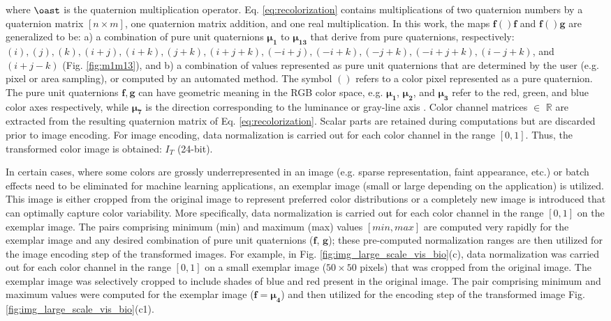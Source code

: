 \documentclass[superscriptaddress,longbibliography,aps,prl,twocolumn,10pt]{revtex4-2}
\begin{document}
\noindent
where $\oast$ is the quaternion multiplication operator. Eq. \ref{eq:recolorization} contains multiplications of two quaternion numbers by a quaternion matrix $[n \times m]$, one quaternion matrix addition, and one real multiplication. In this work, the maps $\boldsymbol{f}()\boldsymbol{f}$ and $\boldsymbol{f}()\boldsymbol{g}$ are generalized to be: a) a combination of pure unit quaternions $\boldsymbol{\mu_{1}}$ to $\boldsymbol{\mu_{13}}$ that derive from pure quaternions, respectively: $(i), (j), (k), (i + j), (i + k), (j + k), (i + j + k), (-i + j), (-i + k), (-j + k), (-i + j + k), (i - j + k)$, and $(i + j - k)$ (Fig. \ref{fig:m1m13}), and b) a combination of values represented as pure unit quaternions that are determined by the user (e.g. pixel or area sampling), or computed by an automated method. The symbol $()$ refers to a color pixel represented as a pure quaternion. The pure unit quaternions $\boldsymbol{f}, \boldsymbol{g}$ can have geometric meaning in the RGB color space, e.g. $\boldsymbol{\mu_1}$, $\boldsymbol{\mu_2}$, and $\boldsymbol{\mu_3}$ refer to the red, green, and blue color axes respectively, while $\boldsymbol{\mu_7}$ is the direction corresponding to the luminance or gray-line axis \cite{Moxey2003, Ell2007a}. Color channel matrices $\in$ $\mathbb{R}$ are extracted from the resulting quaternion matrix of Eq. \ref{eq:recolorization}. Scalar parts are retained during computations but are discarded prior to image encoding. For image encoding, data normalization is carried out for each color channel in the range $[0,1]$. Thus, the transformed color image is obtained: $I_{T}$ (24-bit).

In certain cases, where some colors are grossly underrepresented in an image (e.g. sparse representation, faint appearance, etc.) or batch effects need to be eliminated for machine learning applications, an exemplar image (small or large depending on the application) is utilized. This image is either cropped from the original image to represent preferred color distributions or a completely new image is introduced that can optimally capture color variability. More specifically, data normalization is carried out for each color channel in the range $[0,1]$ on the exemplar image. The pairs comprising minimum (min) and maximum (max) values $[min,max]$ are computed very rapidly for the exemplar image and any desired combination of pure unit quaternions ($\boldsymbol{f}$, $\boldsymbol{g}$); these pre-computed normalization ranges are then utilized for the image encoding step of the transformed images. For example, in Fig. \ref{fig:img_large_scale_vis_bio}(c), data normalization was carried out for each color channel in the range $[0,1]$ on a small exemplar image ($50 \times 50$ pixels) that was cropped from the original image. The exemplar image was selectively cropped to include shades of blue and red present in the original image. The pair comprising minimum and maximum values were computed for the exemplar image ($\boldsymbol{f} = \boldsymbol{\mu_{4}}$) and then utilized for the encoding step of the transformed image Fig. \ref{fig:img_large_scale_vis_bio}(c1).
\end{document}
